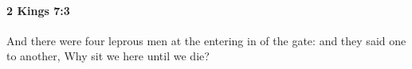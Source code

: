 
		\paragraph{2 Kings 7:3} %
			\label{2KINGS-7-3}

			And there were four leprous men at the entering in of the gate: and they said one to another, Why sit we here until we die?


